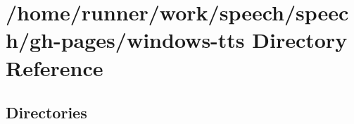 \section{/home/runner/work/speech/speech/gh-\/pages/windows-\/tts Directory Reference}
\label{dir_02735ddd5f59dfdbb14c9c5168ff53c8}
\subsection*{Directories}
\begin{DoxyCompactItemize}
\end{DoxyCompactItemize}
